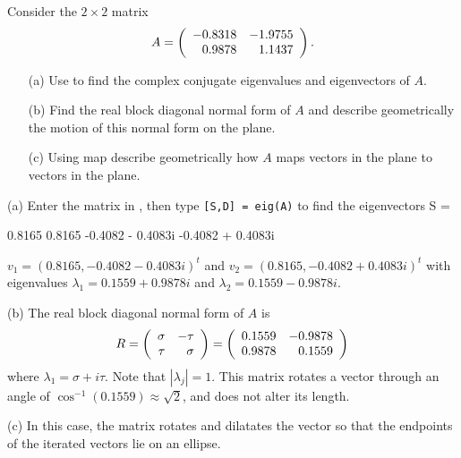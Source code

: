 \documentclass{ximera}
\begin{document}
\begin{computerExercise} \label{c10.4.6}
Consider the $2\times 2$ matrix
\[
A = \left(\begin{array}{rr} -0.8318 & -1.9755\\ 0.9878 &1.1437\end{array}\right).
\]
\begin{itemize}
\item[(a)]  Use \Matlab to find the complex conjugate eigenvalues and 
eigenvectors of $A$.
\item[(b)]  Find the real block diagonal normal form of $A$ and describe
geometrically the motion of this normal form on the plane.
\item[(c)]  Using {\sf map} describe geometrically how $A$ maps vectors in 
the plane to vectors in the plane. 
\end{itemize}

\begin{solution}

(a) Enter the matrix in \Matlabp, then type {\tt [S,D] = eig(A)} to
find the eigenvectors 
S =
 
   0.8165             0.8165
  -0.4082 - 0.4083i  -0.4082 + 0.4083i

$v_1 = (0.8165, -0.4082 - 0.4083i)^t$ and
$v_2 = (0.8165, -0.4082 + 0.4083i)^t$ with eigenvalues
$\lambda_1 = 0.1559 + 0.9878i$ and $\lambda_2 = 0.1559 - 0.9878i$.

(b) The real block diagonal normal form of $A$ is
\[
R = \left(\begin{array}{rr} \sigma & -\tau\\ \tau &\sigma\end{array}\right) = \left(\begin{array}{rr} 0.1559 & -0.9878\\ 0.9878 &0.1559\end{array}\right)
\]
where $\lambda_1 = \sigma + i\tau$.  Note that $|\lambda_j|=1$.  
This matrix rotates a vector through an angle of 
$\cos^{-1}(0.1559) \approx \sqrt{2}$, and does not alter its length.  


(c) In this case, the matrix rotates and dilatates the vector so that
the endpoints of the iterated vectors lie on an ellipse.

\end{solution}
\end{computerExercise}
\end{document}
